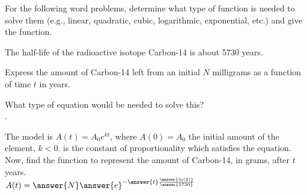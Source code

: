 \documentclass{ximera}
\author{Elizabeth Campolongo}
\begin{document}
\begin{exercise}
For the following word problems, determine what type of function is needed to solve them (e.g., linear, quadratic, cubic, logarithmic, exponential, etc.) and give the function. 
%

\item The half-life of the radioactive isotope Carbon-14 is about 5730 years.

Express the amount of Carbon-14 left from an initial $N$ milligrams
as a function of time $t$ in years.

What type of equation would be needed to solve this?\\
.
\begin{exercise}
The model is $A(t) = A_0e^{kt}$, where $A(0)=A_0$ the initial amount of the element, $k<0$. is the constant of proportionality which satisfies the equation. \\
Now, find the function to represent the amount of Carbon-14, in grams, after $t$ years. \\
$A(t) = \answer{N}\answer{e}^{-\answer{t} \frac{\answer{\ln(2)}}{\answer{5730}}}$
\end{exercise}


\end{exercise}
\end{document}
